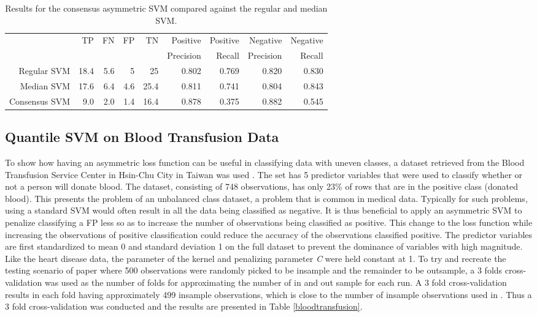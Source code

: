 \documentclass[twoside,11pt]{article}
\begin{document}
\begin{table}[htbp]\label{table:HeartDisease3}
  \centering
    \begin{tabular}{rrrrrrrrr}
    \hline
       & \multirow{2}{*}{TP}    & \multirow{2}{*}{FN}    & \multirow{2}{*}{FP}    & \multirow{2}{*}{TN} & Positive & Positive & Negative & Negative\\
&&&&&  Precision &  Recall &  Precision &  Recall \bigstrut\\
    \hline
    \hline
    Regular SVM & 18.4  & 5.6   & 5     & 25    & 0.802 & 0.769 & 0.820 & 0.830 \bigstrut[t]\\
    Median SVM & 17.6  & 6.4   & 4.6   & 25.4  & 0.811 & 0.741 & 0.804 & 0.843 \\
    Consensus SVM & 9.0   & 2.0   & 1.4   & 16.4  & 0.878 & 0.375 & 0.882 & 0.545 \bigstrut[b]\\
    \hline
    \hline
    \end{tabular}%
    \caption{Results for the consensus asymmetric SVM compared against the regular and median SVM.}
\end{table}%


\subsection{Quantile SVM on Blood Transfusion Data}
To show how having an asymmetric loss function can be useful in classifying data with uneven classes, a dataset retrieved from the Blood Transfusion Service Center in Hsin-Chu City in Taiwan was used \citep{Yeh09}. The set has 5 predictor variables that were used to classify whether or not a person will donate blood. The dataset, consisting of 748 observations, has only 23\% of rows that are in the positive class (donated blood). This presents the problem of an unbalanced class dataset, a problem that is common in medical data. Typically for such problems, using a standard SVM would often result in all the data being classified as negative. It is thus beneficial to apply an asymmetric SVM to penalize classifying a FP less so as to increase the number of observations being classified as positive. This change to the loss function while increasing the observations of positive classification could reduce the accuracy of the observations classified positive. The predictor variables are first standardized to mean 0 and standard deviation 1 on the full dataset to prevent the dominance of variables with high magnitude. Like the heart disease data, the parameter of the kernel and penalizing parameter \emph{C} were held constant at 1. To try and recreate the testing scenario of \citet{Yeh09} paper where 500 observations were randomly picked to be insample and the remainder to be outsample, a 3 folds cross-validation was used as the number of folds for approximating the number of in and out sample for each run. A 3 fold cross-validation results in each fold having approximately 499 insample observations, which is close to the number of insample observations used in \citet{Yeh09}. Thus a 3 fold cross-validation was conducted and the results are presented in Table \ref{bloodtransfusion}.
\end{document}
